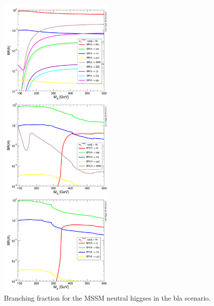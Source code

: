 \begin{figure}[tp]
     \begin{center}

            \includegraphics[width=0.5\textwidth]{figure/br.png}

    \end{center}
    \caption{Branching fraction for the MSSM neutral higgses in the bla scenario.}
   \label{fig:br}

\end{figure}

